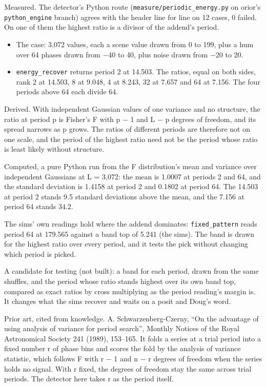 Measured. The detector's Python route (\texttt{measure/\allowbreak{}periodic\_\allowbreak{}energy.\allowbreak{}py} on orior's \texttt{python\_\allowbreak{}engine} branch) agrees with the header line for line on 12 cases, 0 failed. On one of them the highest ratio is a divisor of the addend's period.

\begin{itemize}
\item The case: 3,072 values, each a scene value drawn from 0 to 199, plus a hum over 64 phases drawn from −40 to 40, plus noise drawn from −20 to 20.
\item \texttt{energy\_\allowbreak{}recover} returns period 2 at 14.503. The ratios, equal on both sides, rank 2 at 14.503, 8 at 9.048, 4 at 8.243, 32 at 7.657 and 64 at 7.156. The four periods above 64 each divide 64.
\end{itemize}

Derived. With independent Gaussian values of one variance and no structure, the ratio at period p is Fisher's F with p − 1 and L − p degrees of freedom, and its spread narrows as p grows. The ratios of different periods are therefore not on one scale, and the period of the highest ratio need not be the period whose ratio is least likely without structure.

Computed, a pure Python run from the F distribution's mean and variance over independent Gaussians at L = 3,072: the mean is 1.0007 at periods 2 and 64, and the standard deviation is 1.4158 at period 2 and 0.1802 at period 64. The 14.503 at period 2 stands 9.5 standard deviations above the mean, and the 7.156 at period 64 stands 34.2.

The sims' own readings hold where the addend dominates: \texttt{fixed\_\allowbreak{}pattern} reads period 64 at 179.565 against a band top of 5.241 (the sims). The band is drawn for the highest ratio over every period, and it tests the pick without changing which period is picked.

A candidate for testing (not built): a band for each period, drawn from the same shuffles, and the period whose ratio stands highest over its own band top, compared as exact ratios by cross multiplying as the period reading's margin is. It changes what the sims recover and waits on a posit and Doug's word.

Prior art, cited from knowledge. A. Schwarzenberg-Czerny, “On the advantage of using analysis of variance for period search”, Monthly Notices of the Royal Astronomical Society 241 (1989), 153–165. It folds a series at a trial period into a fixed number r of phase bins and scores the fold by the analysis of variance statistic, which follows F with r − 1 and n − r degrees of freedom when the series holds no signal. With r fixed, the degrees of freedom stay the same across trial periods. The detector here takes r as the period itself.
